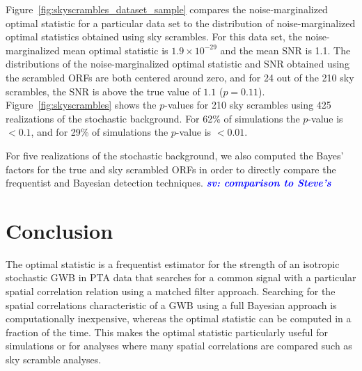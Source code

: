 \documentclass[twocolumn,aps,prd,superscriptaddress]{revtex4-1}
\newcommand{\sv}[1]{\textcolor{blue}{\it{\textbf{sv: #1}}} }
\newcommand{\Agw}{\ensuremath{A_\mathrm{gw}}}
\begin{document}
Figure~\ref{fig:skyscrambles_dataset_sample} compares the noise-marginalized optimal statistic 
for a particular data set to the distribution of noise-marginalized optimal statistics obtained using sky scrambles. 
For this data set, the noise-marginalized mean optimal statistic is 
$1.9\times10^{-29}$ and the mean SNR is 1.1. 
The distributions of the noise-marginalized optimal statistic and SNR obtained using the scrambled ORFs 
are both centered around zero, 
and for 24 out of the 210 sky scrambles, the SNR is above the true value of $1.1$ ($p=0.11$). 
Figure~\ref{fig:skyscrambles} shows the $p$-values for 210 sky scrambles 
using 425 realizations of the stochastic background. 
For 62\% of simulations the $p$-value is $<0.1$, and for 29\% of simulations the $p$-value is $<0.01$.

For five realizations of the stochastic background, we also computed the Bayes' factors for the 
true and sky scrambled ORFs in order to directly compare 
the frequentist and Bayesian detection techniques.
\sv{comparison to Steve's}


\section{Conclusion}
\label{sec:conclusion}

The optimal statistic is a frequentist estimator for the strength of 
an isotropic stochastic GWB in PTA data that searches 
for a common signal with a particular spatial correlation relation 
using a matched filter approach. 
Searching for the spatial correlations characteristic of a GWB 
using a full Bayesian approach is computationally inexpensive, 
whereas the optimal statistic can be computed in a fraction of the time. 
This makes the optimal statistic particularly useful for simulations 
or for analyses where many spatial correlations are compared 
such as sky scramble analyses.
\end{document}
